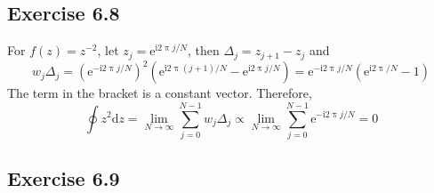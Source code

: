 \documentclass[]{ctexart}
\begin{document}
	\subsection{Exercise 6.8}
	For $f(z)=z^{-2}$, let $z_j=\mathrm{e}^{\mathrm{i}2\uppi j/N}$, then $\Delta_j=z_{j+1}-z_j$ and 
	\begin{equation*}
	w_j\Delta_j=(\mathrm{e}^{-\mathrm{i}2\uppi j/N})^2(\mathrm{e}^{\mathrm{i}2\uppi (j+1)/N}-\mathrm{e}^{\mathrm{i}2\uppi j/N})=\mathrm{e}^{-\mathrm{i}2\uppi j/N}(\mathrm{e}^{\mathrm{i}2\uppi/N}-1)
	\end{equation*}
	The term in the bracket is a constant vector. Therefore, 
	\begin{equation*}
	\oint z^2\mathrm{d}z=\lim_{N\to\infty}\sum_{j=0}^{N-1}w_j\Delta_j\propto\lim_{N\to\infty}\sum_{j=0}^{N-1}\mathrm{e}^{-\mathrm{i}2\uppi j/N}=0
	\end{equation*}
	\subsection{Exercise 6.9}
\end{document}
